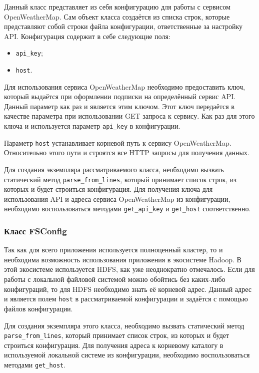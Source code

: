 Данный класс представляет из себя конфигурацию для работы с сервисом OpenWeatherMap.
Сам объект класса создаётся из списка строк, которые представляют собой строки файла конфигурации, ответственные за настройку API.
Конфигурация содержит в себе следующие поля:
\begin{itemize}
    \item \texttt{api\_key};
    \item \texttt{host}.
\end{itemize}

Для использования сервиса OpenWeatherMap необходимо предоставить ключ, который выдаётся при оформлении подписки на определённый сервис API.
Данный параметр как раз и является этим ключом.
Этот ключ передаётся в качестве параметра при использовании GET запроса к сервису.
Как раз для этого ключа и используется параметр \texttt{api\_key} в конфигурации.

Параметр \texttt{host} устанавливает корневой путь к сервису OpenWeatherMap.
Относительно этого пути и строятся все HTTP запросы для получения данных.

Для создания экземпляра рассматриваемого класса, необходимо вызвать статический метод \texttt{parse\_from\_lines}, который принимает список строк, из которых и будет строиться конфигурация.
Для получения ключа для использования API и адреса сервиса OpenWeatherMap из конфигурации, необходимо воспользоваться методами \texttt{get\_api\_key} и \texttt{get\_host} соответственно.

\subsubsection{Класс FSConfig}

Так как для всего приложения используется полноценный кластер, то и необходима возможность использования приложения в экосистеме Hadoop.
В этой экосистеме используется HDFS, как уже неоднократно отмечалось.
Если для работы с локальной файловой системой можно обойтись без каких-либо конфигураций, то для HDFS необходимо знать её корневой адрес.
Данный адрес и является полем \texttt{host} в рассматриваемой конфигурации и задаётся с помощью файлов конфигурации.

Для создания экземпляра этого класса, необходимо вызвать статический метод \texttt{parse\_from\_lines}, который принимает список строк, из которых и будет строиться конфигурация.
Для получения адреса к корневому каталогу в используемой локальной системе из конфигурации, необходимо воспользоваться методами \texttt{get\_host}.

